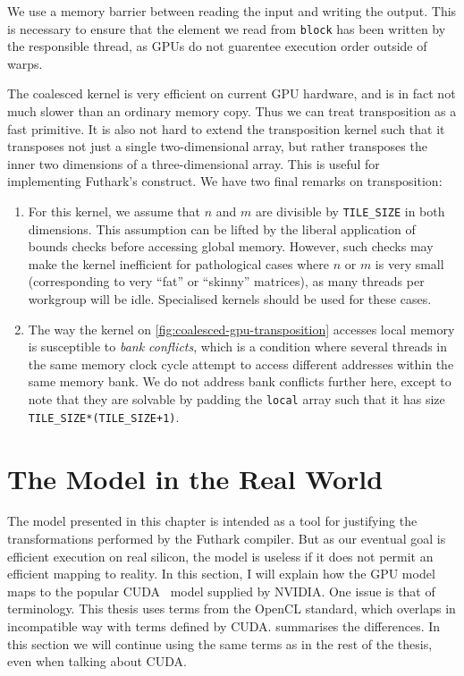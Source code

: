 We use a memory barrier between reading the input and writing the
output.  This is necessary to ensure that the element we read from
\texttt{block} has been written by the responsible thread, as GPUs do
not guarentee execution order outside of warps.

The coalesced kernel is very efficient on current GPU hardware, and is
in fact not much slower than an ordinary memory copy.  Thus we can
treat transposition as a fast primitive.  It is also not hard to
extend the transposition kernel such that it transposes not just a
single two-dimensional array, but rather transposes the inner two
dimensions of a three-dimensional array.  This is useful for
implementing Futhark's  construct.  We have two final
remarks on transposition:

\begin{enumerate}
\item For this kernel, we assume that $n$ and $m$ are divisible by
  \texttt{TILE\_SIZE} in both dimensions.  This assumption can be
  lifted by the liberal application of bounds checks before accessing
  global memory.  However, such checks may make the kernel inefficient
  for pathological cases where $n$ or $m$ is very small (corresponding
  to very ``fat'' or ``skinny'' matrices), as many threads per
  workgroup will be idle.  Specialised kernels should be used for
  these cases.
\item The way the kernel on \cref{fig:coalesced-gpu-transposition}
  accesses local memory is susceptible to \textit{bank conflicts},
  which is a condition where several threads in the same memory clock
  cycle attempt to access different addresses within the same memory
  bank.  We do not address bank conflicts further here, except to note
  that they are solvable by padding the \texttt{local} array such that
  it has size \texttt{TILE\_SIZE*(TILE\_SIZE+1)}.
\end{enumerate}

\section{The Model in the Real World}
\label{sec:gpu-model-real-world}

The model presented in this chapter is intended as a tool for
justifying the transformations performed by the Futhark compiler.  But
as our eventual goal is efficient execution on real silicon, the model
is useless if it does not permit an efficient mapping to reality.  In
this section, I will explain how the GPU model maps to the popular
CUDA~\cite{cuda} model supplied by NVIDIA.  One issue is that of
terminology.  This thesis uses terms from the OpenCL standard, which
overlaps in incompatible way with terms defined by CUDA.
 summarises the differences.  In this section we
will continue using the same terms as in the rest of the thesis, even
when talking about CUDA.


